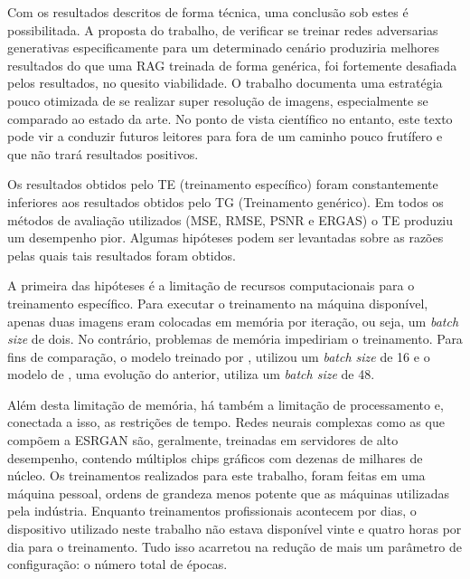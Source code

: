 Com os resultados descritos de forma técnica, uma conclusão sob estes é possibilitada. A proposta do trabalho, de verificar se treinar redes adversarias generativas especificamente para um determinado cenário produziria melhores resultados do que uma RAG treinada de forma genérica, foi fortemente desafiada pelos resultados, no quesito viabilidade. O trabalho documenta uma estratégia pouco otimizada de se realizar super resolução de imagens, especialmente se comparado ao estado da arte. No ponto de vista científico no entanto, este texto pode vir a conduzir futuros leitores para fora de um caminho pouco frutífero e que não trará resultados positivos. 

Os resultados obtidos pelo TE (treinamento específico) foram constantemente inferiores aos resultados obtidos pelo TG (Treinamento genérico). Em todos os métodos de avaliação utilizados (MSE, RMSE, PSNR e ERGAS) o TE produziu um desempenho pior. Algumas hipóteses podem ser levantadas sobre as razões pelas quais tais resultados foram obtidos.

A primeira das hipóteses é a limitação de recursos computacionais para o treinamento específico. Para executar o treinamento na máquina disponível, apenas duas imagens eram colocadas em memória por iteração, ou seja, um \textit{batch size} de dois. No contrário, problemas de memória impediriam o treinamento. Para fins de comparação, o modelo treinado por \cite{wang_esrgan_2018}, utilizou um \textit{batch size} de 16 e o modelo de \cite{wang_real-esrgan_2021}, uma evolução do anterior, utiliza um \textit{batch size} de 48. 

Além desta limitação de memória, há também a limitação de processamento e, conectada a isso, as restrições de tempo. Redes neurais complexas como as que compõem a ESRGAN são, geralmente, treinadas em servidores de alto desempenho, contendo múltiplos chips gráficos com dezenas de milhares de núcleo. Os treinamentos realizados para este trabalho, foram feitas em uma máquina pessoal, ordens de grandeza menos potente que as máquinas utilizadas pela indústria. Enquanto treinamentos profissionais acontecem por dias, o dispositivo utilizado neste trabalho não estava disponível vinte e quatro horas por dia para o treinamento. Tudo isso acarretou na redução de mais um parâmetro de configuração: o número total de épocas.

